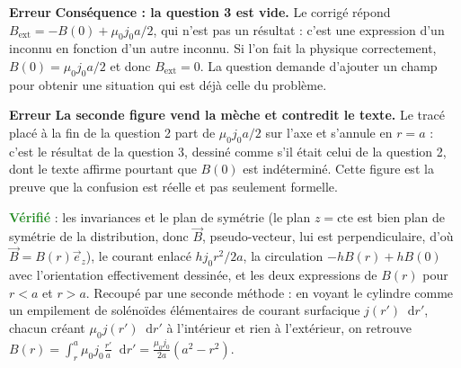 \documentclass[a4paper,11pt]{article}
\newcommand*\dif{\mathop{}\!\mathrm{d}}
\newcommand{\erreur}{\textcolor{BrickRed}{\textbf{Erreur}}}
\newcommand{\verifie}{\textcolor{ForestGreen}{\textbf{Vérifié}}}
\begin{document}
\medskip
\erreur{} \textbf{Conséquence : la question 3 est vide.} Le corrigé répond
$B_{\mathrm{ext}}=-B(0)+\mu_0j_0a/2$, qui n'est pas un résultat : c'est une expression d'un
inconnu en fonction d'un autre inconnu. Si l'on fait la physique correctement, $B(0)=\mu_0j_0a/2$ et
donc $B_{\mathrm{ext}}=0$. La question demande d'ajouter un champ pour obtenir une situation qui est
déjà celle du problème.

\medskip
\erreur{} \textbf{La seconde figure vend la mèche et contredit le texte.} Le tracé placé à la fin de
la question 2 part de $\mu_0j_0a/2$ sur l'axe et s'annule en $r=a$ : c'est le résultat de la
question 3, dessiné comme s'il était celui de la question 2, dont le texte affirme pourtant que
$B(0)$ est indéterminé. Cette figure est la preuve que la confusion est réelle et pas seulement
formelle.

\medskip
\verifie{} : les invariances et le plan de symétrie (le plan $z=\mathrm{cte}$ est bien plan de
symétrie de la distribution, donc $\vec B$, pseudo-vecteur, lui est perpendiculaire, d'où
$\vec B=B(r)\vec e_z$), le courant enlacé $h j_0 r^2/2a$, la circulation $-hB(r)+hB(0)$ avec
l'orientation effectivement dessinée, et les deux expressions de $B(r)$ pour $r<a$ et $r>a$.
Recoupé par une seconde méthode : en voyant le cylindre comme un empilement de solénoïdes
élémentaires de courant surfacique $j(r')\dif r'$, chacun créant $\mu_0 j(r')\dif r'$ à l'intérieur
et rien à l'extérieur, on retrouve $B(r)=\int_r^a\mu_0j_0\frac{r'}{a}\dif r'=\frac{\mu_0j_0}{2a}(a^2-r^2)$.
\end{document}

